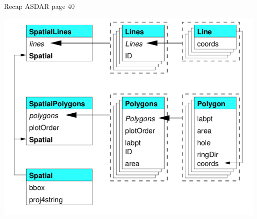 \documentclass[8pt,ignorenonframetext,]{beamer}
\begin{document}
\begin{frame}{Recap ASDAR page 40}

\begin{center}
  \includegraphics[width=1\textwidth]{figSpatialPolygons.png}
\end{center}

\end{frame}
\end{document}
